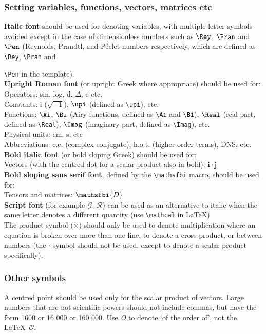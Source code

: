 \documentclass{jfm}
\begin{document}
\subsubsection{Setting variables, functions, vectors, matrices etc}
{\bf Italic font} should be used for denoting variables, with multiple-letter symbols avoided except in the case of dimensionless numbers such as $\Rey$, $\Pran$ and $\Pen$ (Reynolds, Prandtl, and P\'eclet numbers respectively, which are defined as \verb}\Rey}, \verb}\Pran} and {\verb}\Pen} in the template).\\
{\bf Upright Roman font} (or upright Greek where appropriate) should be used for:\\
Operators: sin, log, d, $\Delta$, e etc.\\
Constants: i ($\sqrt{-1}$), $\upi$ (defined as \verb}\upi}), etc.\\
Functions: $\Ai$, $\Bi$ (Airy functions, defined as \verb}\Ai} and \verb}\Bi}), $\Real$ (real part, defined as \verb}\Real}), $\Imag$ (imaginary part, defined as \verb}\Imag}), etc.\\
Physical units: cm, s, etc\\
Abbreviations: c.c. (complex conjugate), h.o.t. (higher-order terms), DNS, etc.\\
{\bf Bold italic font} (or bold sloping Greek) should be used for:\\
Vectors (with the centred dot for a scalar product also in bold): $\boldsymbol{i \cdot j}$\\
{\bf Bold sloping sans serif font}, defined by the \verb}\mathsfbi} macro, should be used for:\\
Tensors and matrices: $\mathsfbi{D}$ \\
{\bf Script font} (for example $\mathcal{G}$, $\mathcal{R}$) can be used as an alternative to italic when the same letter denotes a different quantity (use \verb}\mathcal} in \LaTeX)\\
The product symbol ($\times$) should only be used to denote multiplication where an equation is broken over more than one line, to denote a cross product, or between numbers (the $\cdot$ symbol should not be used, except to denote a scalar product specifically).\\ 

\subsubsection{Other symbols}
A centred point should be used only for the scalar product of vectors.
Large numbers that are not scientific powers should not include commas, but have the
form 1600 or 16 000 or 160 000.
Use \textit{O} to denote `of the order of', not the \LaTeX\ $\mathcal{O}$.

}
\end{document}
